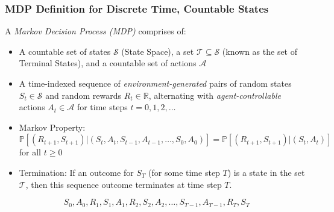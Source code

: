 \documentclass[handout]{beamer}
\begin{document}
\begin{frame}
\frametitle{MDP Definition for Discrete Time, Countable States}
\pause
\begin{definition}
A {\em Markov Decision Process (MDP)} comprises of:

\begin{itemize}

\item A countable set of states $\mathcal{S}$ (State Space), a set $\mathcal{T} \subseteq \mathcal{S}$ (known as the set of Terminal States), and a countable set of actions $\mathcal{A}$

\item A time-indexed sequence of {\em environment-generated} pairs of random states $S_t \in \mathcal{S}$ and random rewards $R_t \in \mathbb{R}$, alternating with {\em agent-controllable} actions $A_t \in \mathcal{A}$ for time steps $t=0, 1, 2, \ldots$

\item Markov Property: $\mathbb{P}[(R_{t+1}, S_{t+1}) | (S_t, A_t, S_{t-1}, A_{t-1}, \ldots, S_0, A_0)] = \mathbb{P}[(R_{t+1}, S_{t+1}) | (S_t, A_t)]$ for all $t \geq 0$

\item Termination: If an outcome for $S_T$ (for some time step $T$) is a state in the set $\mathcal{T}$, then this sequence outcome terminates at time step $T$.

\end{itemize}

\end{definition}
 \pause
  $$S_0, A_0, R_1, S_1, A_1, R_2, S_2, A_2, \ldots, S_{T-1}, A_{T-1}, R_T, S_T$$
\end{frame}
\end{document}
